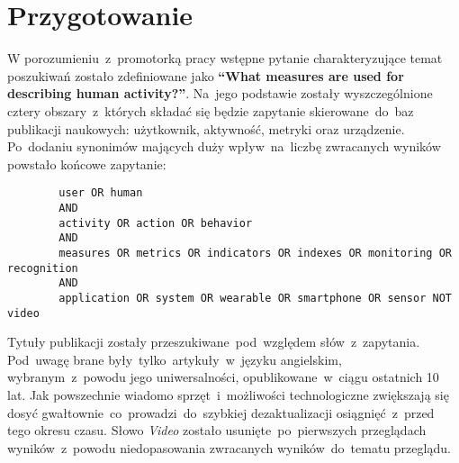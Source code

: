 \section{Przygotowanie}
W porozumieniu~z~promotorką pracy wstępne pytanie charakteryzujące temat poszukiwań zostało zdefiniowane jako \textbf{``What measures are used for describing human activity?''}. Na~jego podstawie zostały wyszczególnione cztery obszary~z~których składać się będzie zapytanie skierowane~do~baz publikacji naukowych: użytkownik, aktywność, metryki oraz urządzenie. Po~dodaniu synonimów mających duży wpływ~na~liczbę zwracanych wyników powstało końcowe zapytanie:

\bigskip
\begin{center}
	\begin{minipage}{0.9\linewidth}
		\begin{verbatim}
		user OR human
		AND
		activity OR action OR behavior
		AND
		measures OR metrics OR indicators OR indexes OR monitoring OR recognition
		AND
		application OR system OR wearable OR smartphone OR sensor NOT video
		\end{verbatim}
	\end{minipage}
\end{center}
\bigskip

Tytuły publikacji zostały przeszukiwane~pod~względem słów~z~zapytania. Pod~uwagę brane były~tylko~artykuły~w~języku angielskim, wybranym~z~powodu jego uniwersalności, opublikowane~w~ciągu ostatnich 10 lat. Jak powszechnie wiadomo sprzęt~i~możliwości technologiczne zwiększają się dosyć gwałtownie~co~prowadzi~do~szybkiej dezaktualizacji osiągnięć~z~przed tego okresu czasu. Słowo \textit{Video} zostało usunięte~po~pierwszych przeglądach wyników~z~powodu niedopasowania zwracanych wyników~do~tematu przeglądu.
